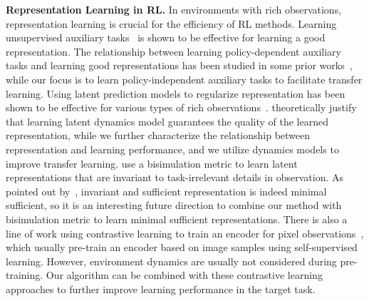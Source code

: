 \textbf{Representation Learning in RL.}
In environments with rich observations, representation learning is crucial for the efficiency of RL methods. Learning unsupervised auxiliary tasks~\citep{jaderberg2016reinforcement} is shown to be effective for learning a good representation. 
The relationship between learning policy-dependent auxiliary tasks and learning good representations has been studied in some prior works~\citep{bellemare2019geometric,dabney2020the,lyle2021effect}, while our focus is to learn policy-independent auxiliary tasks to facilitate transfer learning. 
Using latent prediction models to regularize representation has been shown to be effective for various types of rich observations~\citep{guo2020bootstrap,lee2019stochastic}.  
\citet{gelada2019deepmdp} theoretically justify that learning latent dynamics model guarantees the quality of the learned representation, while we further characterize the relationship between representation and learning performance, and we utilize dynamics models to improve transfer learning.
\citet{zhang2020learning} use a bisimulation metric to learn latent representations that are invariant to task-irrelevant details in observation. As pointed out by~\citet{achille2018emergence}, invariant and sufficient representation is indeed minimal sufficient, so it is an interesting future direction to combine our method with bisimulation metric to learn minimal sufficient representations.
There is also a line of work using contrastive learning to train an encoder for pixel observations~\citep{srinivas2020curl,yarats2021reinforcement,stooke2021decoupling}, which usually pre-train an encoder based on image samples using self-supervised learning. However, environment dynamics are usually not considered during pre-training.
Our algorithm can be combined with these contrastive learning approaches to further improve learning performance in the target task.

